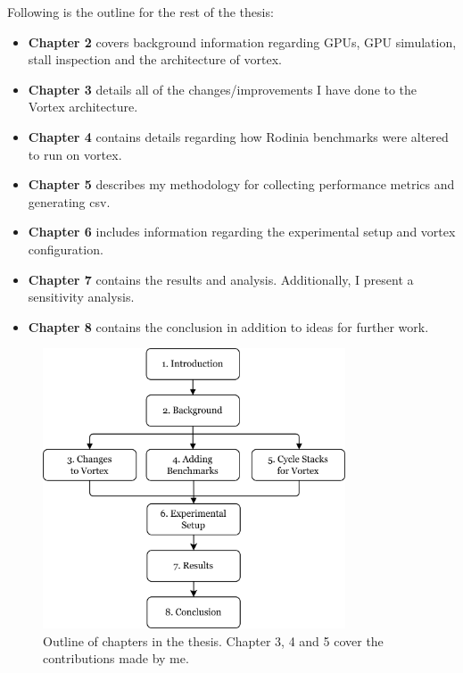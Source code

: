 Following is the outline for the rest of the thesis:

\begin{itemize}
    \item \textbf{Chapter 2} covers background information regarding GPUs, GPU simulation, stall inspection and the architecture of \Gls{vortex}.
    \item \textbf{Chapter 3} details all of the changes/improvements I have done to the Vortex architecture.
    \item \textbf{Chapter 4} contains details regarding how Rodinia benchmarks were altered to run on \Gls{vortex}.
    \item \textbf{Chapter 5} describes my methodology for collecting performance metrics and generating \acrlong{csv}.
    \item \textbf{Chapter 6} includes information regarding the experimental setup and \Gls{vortex} configuration.
    \item \textbf{Chapter 7} contains the results and analysis. Additionally, I present a sensitivity analysis.
    \item \textbf{Chapter 8} contains the conclusion in addition to ideas for further work.
\end{itemize}

\begin{figure}
    \centering
    \includegraphics[width=0.8\textwidth]{figures/thesis-outline.png}
    \caption[Outline of the thesis]{Outline of chapters in the thesis. Chapter 3, 4 and 5 cover the contributions made by me.}
    \label{fig:thesis_outline}
\end{figure}


